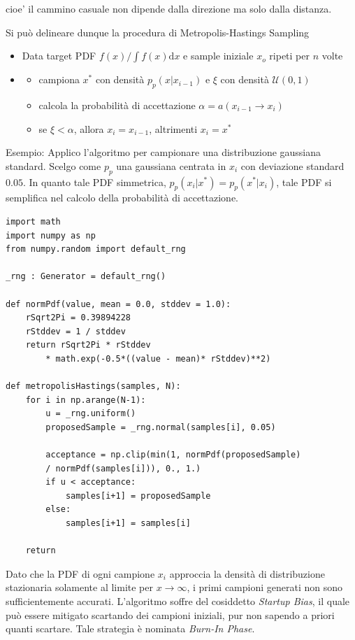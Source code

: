 cioe' il cammino casuale non dipende dalla direzione ma solo dalla distanza.\par
Si pu\`o delineare dunque la procedura di Metropolis-Hastings Sampling
\begin{itemize}[noitemsep,topsep=0pt]
	\item Data target PDF $f(x)/\int f(x)\mathrm{d}x$ e sample iniziale $x_o$ ripeti per $n$ volte
	\item[]\begin{itemize}[noitemsep,topsep=0pt]
		\item campiona $x^*$ con densit\`a $p_p(x|x_{i-1})$ e $\xi$ con densit\`a $\mathcal{U}(0,1)$
		\item calcola la probabilit\`a di accettazione $\alpha = a(x_{i-1}\to x_i)$
		\item se $\xi < \alpha$, allora $x_i = x_{i-1}$, altrimenti $x_i = x^*$
	\end{itemize}
\end{itemize}
Esempio: Applico l'algoritmo per campionare una distribuzione gaussiana standard. Scelgo come $p_p$ una gaussiana centrata in $x_i$ con 
deviazione standard $0.05$. In quanto tale PDF simmetrica, \mbox{$p_p(x_i|x^*)=p_p(x^*|x_i)$}, tale PDF si semplifica nel calcolo della probabilit\`a 
di accettazione.
\begin{verbatim}
import math
import numpy as np
from numpy.random import default_rng

_rng : Generator = default_rng()

def normPdf(value, mean = 0.0, stddev = 1.0):
    rSqrt2Pi = 0.39894228
    rStddev = 1 / stddev
    return rSqrt2Pi * rStddev 
		* math.exp(-0.5*((value - mean)* rStddev)**2)

def metropolisHastings(samples, N):
    for i in np.arange(N-1):
        u = _rng.uniform()
        proposedSample = _rng.normal(samples[i], 0.05)

        acceptance = np.clip(min(1, normPdf(proposedSample) 
		/ normPdf(samples[i])), 0., 1.)
        if u < acceptance:
            samples[i+1] = proposedSample
        else:
            samples[i+1] = samples[i]

    return
\end{verbatim}
Dato che la PDF di ogni campione $x_i$ approccia la densit\`a di distribuzione stazionaria solamente al limite per $x\to\infty$, i primi campioni
generati non sono sufficientemente accurati. L'algoritmo soffre del cosiddetto \textit{Startup Bias}, il quale pu\`o essere mitigato scartando 
dei campioni iniziali, pur non sapendo a priori quanti scartare. Tale strategia \`e nominata \textit{Burn-In Phase}.\par
